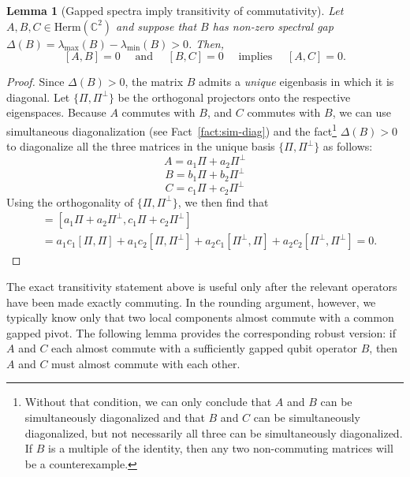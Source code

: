 \documentclass[11pt]{article}
\theoremstyle{plain}
\newtheorem{lemma}[theorem]{Lemma}
\begin{document}
\begin{lemma}[Gapped spectra imply transitivity of commutativity]\label{lem:transitivity}
Let $A,B,C \in \mathrm{Herm}(\mathbb{C}^{2})$ and suppose that $B$ has non-zero spectral gap $\Delta(B)=\lambda_{\max}(B) - \lambda_{\min}(B) > 0$. Then, 
$$
[A,B] = 0 \quad \text{ and } \quad [B,C] = 0 \quad \text{ implies } \quad [A,C]=0.
$$
\end{lemma}
\begin{proof}
Since $\Delta(B) > 0$, the matrix $B$ admits a \emph{unique} eigenbasis in which it is diagonal. Let $\{\Pi, \Pi^\perp\}$ be the orthogonal projectors onto the respective eigenspaces.
Because $A$ commutes with $B$, and $C$ commutes with $B$, we can use simultaneous diagonalization (see Fact~\ref{fact:sim-diag}) and the fact\footnote{Without that condition, we can only conclude that $A$ and $B$ can be simultaneously diagonalized and that $B$ and $C$ can be simultaneously diagonalized, but not necessarily all three can be simultaneously diagonalized. If $B$ is a multiple of the identity, then any two non-commuting matrices will be a counterexample.} $\Delta(B) > 0$ to diagonalize all the three matrices in the unique basis $\{\Pi, \Pi^\perp\}$ as follows:
\begin{equation}
    A = a_1 \Pi + a_2 \Pi^\bot
\end{equation}
\begin{equation}
    B = b_1 \Pi + b_2 \Pi^\bot
\end{equation}
\begin{equation}
    C = c_1 \Pi + c_2 \Pi^\bot
\end{equation}
Using the orthogonality of $\{\Pi, \Pi^\perp\}$, we then find that
\begin{align*}
    [A, C] &= \left[a_1 \Pi + a_2 \Pi^\bot,  c_1 \Pi + c_2 \Pi^\bot\right]\\
    &= a_1c_1 [\Pi, \Pi] + a_1 c_2 [\Pi, \Pi^\bot] + a_2 c_1 [\Pi^\bot, \Pi] + a_2 c_2 [\Pi^\bot, \Pi^\bot] = 0.
\end{align*}
\end{proof}

The exact transitivity statement above is useful only after the relevant
operators have been made exactly commuting.  In the rounding argument,
however, we typically know only that two local components almost commute
with a common gapped pivot.  The following lemma provides the corresponding
robust version: if $A$ and $C$ each almost commute with a sufficiently
gapped qubit operator $B$, then $A$ and $C$ must almost commute with each
other. 
\end{document}
